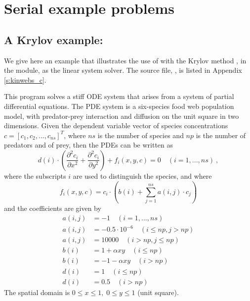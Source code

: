 \section{Serial example problems}\label{s:ex_serial}

\subsection{A Krylov example: }\label{ss:kinwebs}

We give here an example that illustrates the use of {\kinsol} with the Krylov
method {\spgmr}, in the {\kinspgmr} module, as the linear system solver.
The source file, , is listed in Appendix \ref{s:kinwebs_c}.

This program solves a stiff ODE system that arises from a system of partial
differential equations. The PDE system is a six-species food web population
model, with predator-prey interaction and diffusion on the unit square in
two dimensions. Given the dependent variable vector of species concentrations
$c = [c_1, c_2,..., c_{ns}]^T$, where $ns$ is the number of species and $np$
is the number of predators and of prey, then
the PDEs can be written as
\begin{equation}\label{kinwebspde}
  d(i) \cdot \left( \frac{\partial^2 c_i}{\partial x^2} + \frac{\partial^2 c_i}{\partial y^2} \right) + f_i(x,y,c) = 0
  \quad (i=1,...,ns)~,
\end{equation}
where the subscripts $i$ are used to distinguish the species, and where
\begin{equation}\label{e:kinwebsfterm}
f_i(x,y,c) = c_i \cdot \left(b(i) + \sum_{j=1}^{ns} a(i,j) \cdot c_j \right)
\end{equation}
and the coefficients are given by
\begin{equation}\label{e:kinwebs:r}
\begin{split}
  a(i,j)& = -1 \quad (i = 1,...,ns) \\
  a(i,j)& = -0.5\cdot 10^{-6} \quad (i \leq np , j > np) \\
  a(i,j)& = 10000  \quad (i > np , j \leq np) \\
  b(i)& = 1 + \alpha x y \quad (i \leq np) \\
  b(i)& = -1 - \alpha x y \quad (i > np) \\
  d(i)& = 1 \quad (i \leq np) \\
  d(i)& = 0.5 \quad (i > np)
\end{split}
\end{equation}
The spatial domain is $0 \leq x \leq 1,\;0 \leq y \leq 1$ (unit square).

